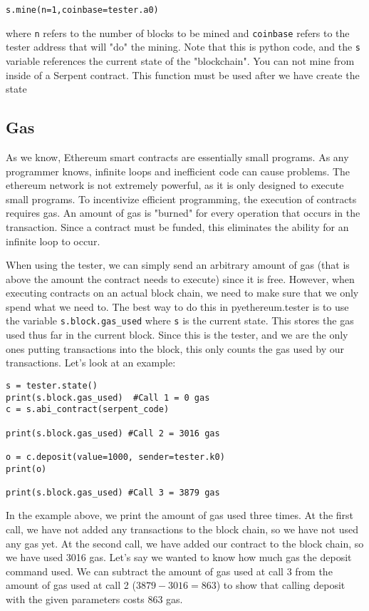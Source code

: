 \documentclass[12pt]{article}
\begin{document}
\begin{verbatim}
s.mine(n=1,coinbase=tester.a0)
\end{verbatim}

where \texttt{n} refers to the number of blocks to be mined and \texttt{coinbase} refers to the tester address that will "do" the mining. Note that this is python code, and the \texttt{s} variable references the current state of the "blockchain". You can not mine from inside of a Serpent contract. This function must be used after we have create the state \cite{Usingpyethereum.tester}

\subsection{Gas}
As we know, Ethereum smart contracts are essentially small programs. As any programmer knows, infinite loops and inefficient code can cause problems. The ethereum network is not extremely powerful, as it is only designed to execute small programs. To incentivize efficient programming, the execution of contracts requires gas. An amount of gas is "burned" for every operation that occurs in the transaction. Since a contract must be funded, this eliminates the ability for an infinite loop to occur.

When using the tester, we can simply send an arbitrary amount of gas (that is above the amount the contract needs to execute) since it is free. However, when executing contracts on an actual block chain, we need to make sure that we only spend what we need to. The best way to do this in pyethereum.tester is to use the variable \texttt{s.block.gas\_used} where \texttt{s} is the current state. This stores the gas used thus far in the current block. Since this is the tester, and we are the only ones putting transactions into the block, this only counts the gas used by our transactions. Let's look at an example:

\begin{verbatim}
s = tester.state()
print(s.block.gas_used)  #Call 1 = 0 gas
c = s.abi_contract(serpent_code)

print(s.block.gas_used) #Call 2 = 3016 gas

o = c.deposit(value=1000, sender=tester.k0)
print(o)

print(s.block.gas_used) #Call 3 = 3879 gas
\end{verbatim}

In the example above, we print the amount of gas used three times. At the first call, we have not added any transactions to the block chain, so we have not used any gas yet. At the second call, we have added our contract to the block chain, so we have used 3016 gas. Let's say we wanted to know how much gas the deposit command used. We can subtract the amount of gas used at call 3 from the amount of gas used at call 2 ($3879-3016 = 863$) to show that calling deposit with the given parameters costs 863 gas. 
\end{document}
